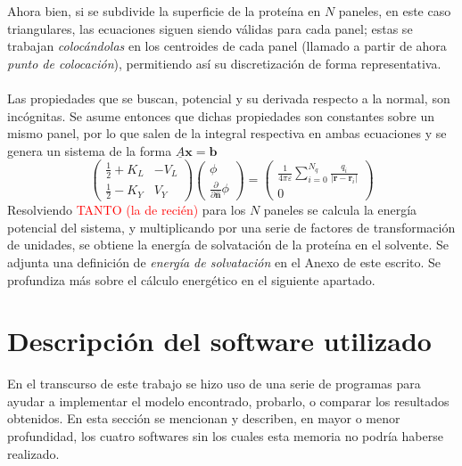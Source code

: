\documentclass[12pt, oneside, numbers, spanish]{ezthesis}
\numberwithin{equation}{section}
\begin{document}
Ahora bien, si se subdivide la superficie de la proteína en $N$ paneles, en este caso triangulares, las ecuaciones siguen siendo válidas para cada panel; estas se trabajan \textit{colocándolas} en los centroides de cada panel (llamado a partir de ahora \textit{punto de colocación}), permitiendo así su discretización de forma representativa.\\\\
Las propiedades que se buscan, potencial y su derivada respecto a la normal, son incógnitas. Se asume entonces que dichas propiedades son constantes sobre un mismo panel, por lo que salen de la integral respectiva en ambas ecuaciones y se genera un sistema de la forma $\underline{A}\mathbf{x} = \mathbf{b}$
\begin{equation}
	\renewcommand\arraystretch{1.6}
	\begin{pmatrix}
		\frac{1}{2} + K_L & -V_L \\ \frac{1}{2} - K_Y & V_Y
	\end{pmatrix}
	\begin{pmatrix}
		\phi \\ \frac{\partial}{\partial\hat{\mathbf{n}}}\phi
	\end{pmatrix}
	=
	\begin{pmatrix}
		\frac{1}{4\pi\varepsilon}\sum_{i=0}^{N_q}\frac{q_i}{|\mathbf{r} - \mathbf{r}_i|} \\ 0
	\end{pmatrix}
\end{equation}
Resolviendo \textcolor{red}{TANTO (la de recién)} para los $N$ paneles se calcula la energía potencial del sistema, y multiplicando por una serie de factores de transformación de unidades, se obtiene la energía de solvatación de la proteína en el solvente. Se adjunta una definición de \textit{energía de solvatación} en el Anexo de este escrito. Se profundiza más sobre el cálculo energético en el siguiente apartado.






\section{Descripción del software utilizado}\label{Sec:SW_Description}
En el transcurso de este trabajo se hizo uso de una serie de programas para ayudar a implementar el modelo encontrado, probarlo, o comparar los resultados obtenidos. En esta sección se mencionan y describen, en mayor o menor profundidad, los cuatro softwares sin los cuales esta memoria no podría haberse realizado.
\end{document}
